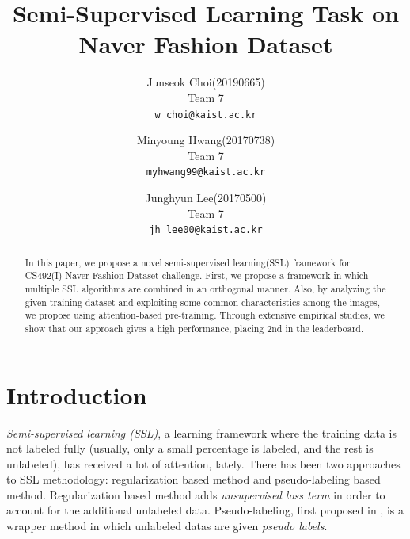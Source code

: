 \documentclass[10pt,twocolumn,letterpaper]{article}
\begin{document}
\title{Semi-Supervised Learning Task on Naver Fashion Dataset}

\author{Junseok Choi(20190665)\\
Team 7\\
{\tt\small w\_choi@kaist.ac.kr}
\and
Minyoung Hwang(20170738)\\
Team 7\\
{\tt\small myhwang99@kaist.ac.kr}
\and
Junghyun Lee(20170500)\\
Team 7\\
{\tt\small jh\_lee00@kaist.ac.kr}
}

\maketitle

\begin{abstract}
In this paper, we propose a novel semi-supervised learning(SSL) framework for CS492(I) Naver Fashion Dataset challenge. First, we propose a framework in which multiple SSL algorithms are combined in an orthogonal manner.
Also, by analyzing the given training dataset and exploiting some common characteristics among the images, we propose using attention-based pre-training.
Through extensive empirical studies, we show that our approach gives a high performance, placing $2$nd in the leaderboard.
\end{abstract}

\section{Introduction}
{\it Semi-supervised learning (SSL)}, a learning framework where the training data is not labeled fully (usually, only a small percentage is labeled, and the rest is unlabeled), has received a lot of attention, lately.
There has been two approaches to SSL methodology: regularization based method and pseudo-labeling based method.
Regularization based method adds {\it unsupervised loss term} in order to account for the additional unlabeled data.
Pseudo-labeling, first proposed in \cite{Lee13}, is a wrapper method in which unlabeled datas are given {\it pseudo labels}.
\end{document}
